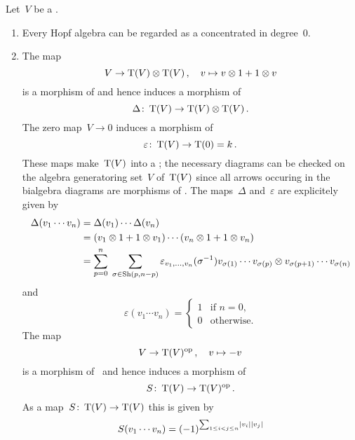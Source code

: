\documentclass[a4paper,10pt,headings=standardclasses]{scrartcl}
\begin{document}
\begin{example}
  \label{examples for dgh}
  Let~$V$ be a {\dgv}.
  \begin{enumerate}
    \item
      Every Hopf algebra can be regarded as a {\dgh} concentrated in degree~$0$.
    \item
      The map
      \[
        V
        \to
        \operatorname{T}(V) \otimes \operatorname{T}(V) \,,
        \quad
        v
        \mapsto
        v \otimes 1 + 1 \otimes v
      \]
      is a morphism of {\dgvs} and hence induces a morphism of~{\dgas}
      \[
        \Delta
        \colon
        \operatorname{T}(V)
        \to
        \operatorname{T}(V) \otimes \operatorname{T}(V) \,.
      \]
      The zero map~$V \to 0$ induces a morphism of~{\dgas}
      \[
        \varepsilon
        \colon
        \operatorname{T}(V)
        \to
        \operatorname{T}(0)
        =
        k \,.
      \]
      These maps make~$\operatorname{T}(V)$ into a {\dgb};
      the necessary diagrams can be checked on the algebra generatoring set~$V$ of~$\operatorname{T}(V)$ since all arrows occuring in the bialgebra diagrams are morphisms of {\dgas}.
      The maps~$\Delta$ and~$\varepsilon$ are explicitely given by
      \begin{align*}
        \Delta(v_1 \dotsm v_n)
        &=
        \Delta(v_1) \dotsm \Delta(v_n)
        \\
        &=
        (v_1 \otimes 1 + 1 \otimes v_1)
        \dotsm
        (v_n \otimes 1 + 1 \otimes v_n)
        \\
        &=
        \sum_{p=0}^n
        \;
        \sum_{\sigma \in \operatorname{Sh}(p,n-p)}
        \varepsilon_{v_1, \dotsc, v_n}(\sigma^{-1})
        v_{\sigma(1)} \dotsm v_{\sigma(p)}
        \otimes
        v_{\sigma(p+1)} \dotsm v_{\sigma(n)}
      \end{align*}
      and
      \[
        \varepsilon( v_1 \dotsm v_n )
        =
        \begin{cases}
          1 & \text{if~$n = 0$}, \\
          0 & \text{otherwise}.
        \end{cases}
      \]
      The map
      \[
        V
        \to
        \operatorname{T}(V)^{\mathrm{op}} \,,
        \quad
        v
        \mapsto
        -v
      \]
      is a morphism of~{\dgvs} and hence induces a morphism of {\dgas}
      \[
        S
        \colon
        \operatorname{T}(V)
        \to
        \operatorname{T}(V)^{\mathrm{op}} \,.
      \]
      As a map~$S \colon \operatorname{T}(V) \to \operatorname{T}(V)$ this is given by
      \[
        S(v_1 \dotsm v_n)
        =
        (-1)^{\sum_{1 \leq i < j \leq n} \lvert v_i\rvert \lvert v_j\rvert}
\]
\end{enumerate}
\end{example}
\end{document}
